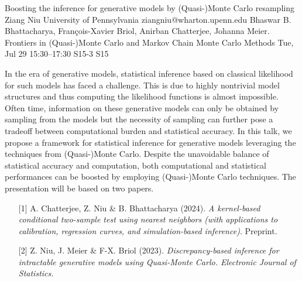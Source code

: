\begin{talk}
  {Boosting the inference for generative models by (Quasi-)Monte Carlo resampling}%
  {Ziang Niu}%
  {University of Pennsylvania}%
  {ziangniu@wharton.upenn.edu}%
  {Bhaswar B. Bhattacharya, François-Xavier Briol, Anirban Chatterjee, Johanna Meier.}%
  {Frontiers in (Quasi-)Monte Carlo and Markov Chain Monte Carlo Methods}%
  {Tue, Jul 29 15:30–17:30}%
  {S15-3}%
  {S15}%
				
			
In the era of generative models, statistical inference based on classical likelihood for such models has faced a challenge. This is due to highly nontrivial model structures and thus computing the likelihood functions is almost impossible. Often time, information on these generative models can only be obtained by sampling from the models but the necessity of sampling can further pose a tradeoff between computational burden and statistical accuracy. In this talk, we propose a framework for statistical inference for generative models leveraging the techniques from (Quasi-)Monte Carlo. Despite the unavoidable balance of statistical accuracy and computation, both computational and statistical performances can be boosted by employing (Quasi-)Monte Carlo techniques. The presentation will be based on two papers.

\begin{enumerate}
	\item[{[1]}] A. Chatterjee, Z. Niu \& B. Bhattacharya (2024). {\it A kernel-based conditional two-sample test using nearest neighbors (with applications to calibration, regression curves, and simulation-based inference)}. Preprint.
	\item[{[2]}] Z. Niu, J. Meier \& F-X. Briol (2023). \it{Discrepancy-based inference for
  intractable generative models using
  Quasi-Monte Carlo.} Electronic Journal of Statistics.
\end{enumerate}

\medskip

\end{talk}

